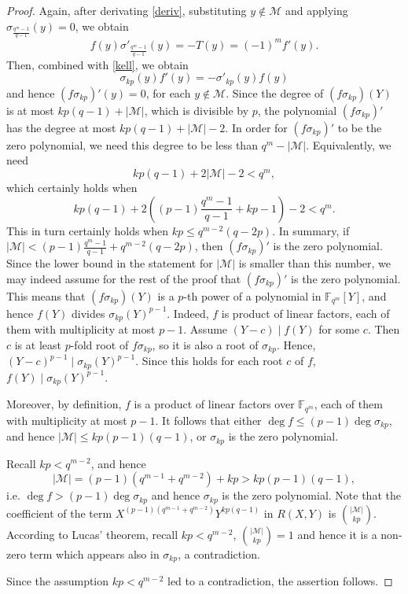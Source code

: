 \documentclass[12pt]{article}
\newcommand{\cM}{{\mathcal M}}
\newcommand{\F}{{\mathbb F}}
\begin{document}
\begin{proof}
	Again, after derivating \eqref{deriv}, substituting $y\notin \cM$ and applying $\sigma_{\frac{q^m-1}{q-1}}(y)=0$, we obtain
	\[f(y)\sigma'_{\frac{q^m-1}{q-1}}(y)=-T(y)=(-1)^mf'(y).\]
	Then, combined with \eqref{kell}, we obtain
	\[\sigma_{kp}(y)f'(y)=-\sigma'_{kp}(y)f(y)\]
	and hence 
	$(f\sigma_{kp})'(y)=0$, for each $y\notin \cM$.
	Since the degree of $(f\sigma_{kp})(Y)$ is at most $kp(q-1)+|\cM|$, which is divisible by $p$, the polynomial $(f\sigma_{kp})'$ has the degree at most $kp(q-1)+|\cM|-2$. In order for $(f\sigma_{kp})'$ to be the zero polynomial, we need this degree to be less than $q^m-|\cM|$. Equivalently, we need
	\[kp(q-1)+2|\cM|-2<q^m,\]
	which certainly holds when
	\[kp(q-1)+2\left ((p-1)\frac{q^{m}-1}{q-1}+kp-1\right)-2 <   q^m.\]
	This in turn certainly holds when $kp \leq q^{m-2}(q-2p)$. In summary, if $|\cM|<(p-1)\frac{q^m-1}{q-1}+q^{m-2}(q-2p)$, then $(f\sigma_{kp})'$ is the zero polynomial. Since the lower bound in the statement for $|\cM|$ is smaller than this number, we may indeed assume for the rest of the proof that $(f\sigma_{kp})'$ is the zero polynomial. 
	This means that
	$(f\sigma_{kp})(Y)$ is a  $p$-th power of a polynomial in $\F_{q^m}[Y]$, and hence $f(Y)$ divides $\sigma_{kp}(Y)^{p-1}$. 
	Indeed, $f$ is product of linear factors, each of them with multiplicity at most $p-1$. Assume $(Y-c) \mid f(Y)$ for some $c$. Then $c$ is at least $p$-fold root of $f\sigma_{kp}$, so it is also a root of $\sigma_{kp}$. Hence, $(Y-c)^{p-1} \mid \sigma_{kp}(Y)^{p-1}$. Since this holds for each root $c$ of $f$,  $f(Y) \mid \sigma_{kp}(Y)^{p-1}$.
	
	
	
	Moreover, by definition, $f$ is a product of linear factors over $\F_{q^m}$, each of them with multiplicity at most $p-1$. It follows that either $\deg f \leq  (p-1)\deg\sigma_{kp}$, 
	and hence $|\cM|\leq kp(p-1)(q-1)$, or $\sigma_{kp}$ is the zero polynomial.
	
	Recall $kp<q^{m-2}$, and hence
	\[|\cM|=(p-1)(q^{m-1}+q^{m-2})+kp>kp(p-1)(q-1),\] 
	i.e. $\deg f>(p-1)\deg \sigma_{kp}$ and hence $\sigma_{kp}$ is the zero polynomial.
	Note that the coefficient of the term
	$X^{(p-1)(q^{m-1}+q^{m-2})}Y^{kp(q-1)}$ in $R(X,Y)$ is
	$\binom{|\cM|}{kp}$. According to Lucas' theorem, recall 
	$kp<q^{m-2}$,  $\binom{|\cM|}{kp}=1$ and hence it is a non-zero term which appears also in $\sigma_{kp}$, a contradiction. 
	
	Since the assumption $kp<q^{m-2}$ led to a contradiction, the assertion follows.
\end{proof}
\end{document}
